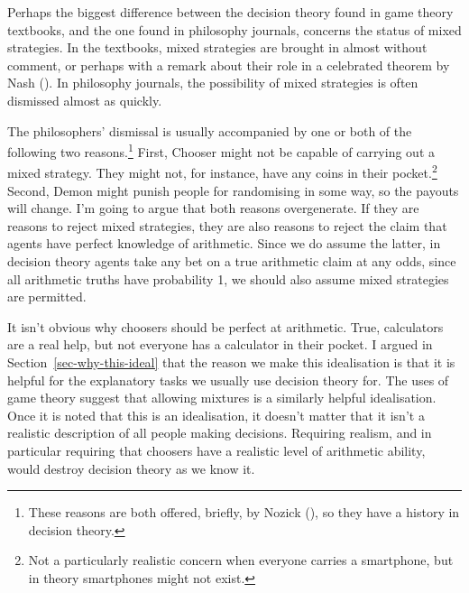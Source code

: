 \documentclass[
  12pt,
  letterpaper,
  DIV=11,
  numbers=noendperiod]{scrreprt}
\begin{document}
Perhaps the biggest difference between the decision theory found in game
theory textbooks, and the one found in philosophy journals, concerns the
status of mixed strategies. In the textbooks, mixed strategies are
brought in almost without comment, or perhaps with a remark about their
role in a celebrated theorem by Nash (). In
philosophy journals, the possibility of mixed strategies is often
dismissed almost as quickly.

The philosophers' dismissal is usually accompanied by one or both of the
following two reasons.\footnote{These reasons are both offered, briefly,
  by Nozick (), so they have a history in
  decision theory.} First, Chooser might not be capable of carrying out
a mixed strategy. They might not, for instance, have any coins in their
pocket.\footnote{Not a particularly realistic concern when everyone
  carries a smartphone, but in theory smartphones might not exist.}
Second, Demon might punish people for randomising in some way, so the
payouts will change. I'm going to argue that both reasons overgenerate.
If they are reasons to reject mixed strategies, they are also reasons to
reject the claim that agents have perfect knowledge of arithmetic. Since
we do assume the latter, in decision theory agents take any bet on a
true arithmetic claim at any odds, since all arithmetic truths have
probability 1, we should also assume mixed strategies are permitted.

It isn't obvious why choosers should be perfect at arithmetic. True,
calculators are a real help, but not everyone has a calculator in their
pocket. I argued in Section~\ref{sec-why-this-ideal} that the reason we
make this idealisation is that it is helpful for the explanatory tasks
we usually use decision theory for. The uses of game theory suggest that
allowing mixtures is a similarly helpful idealisation. Once it is noted
that this is an idealisation, it doesn't matter that it isn't a
realistic description of all people making decisions. Requiring realism,
and in particular requiring that choosers have a realistic level of
arithmetic ability, would destroy decision theory as we know it.
\end{document}
